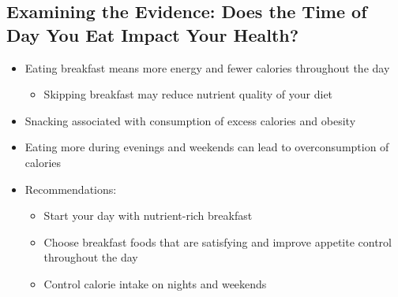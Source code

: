 \documentclass[12pt]{article}
\begin{document}
        \subsection{Examining the Evidence: Does the Time of Day You Eat Impact Your Health?}
            \begin{itemize}
                \item Eating breakfast means more energy and fewer calories throughout the day
                    \begin{itemize}
                        \item Skipping breakfast may reduce nutrient quality of your diet
                    \end{itemize}
                \item Snacking associated with consumption of excess calories and obesity
                \item Eating more during evenings and weekends can lead to overconsumption of calories
                \item Recommendations:
                    \begin{itemize}
                        \item Start your day with nutrient-rich breakfast
                        \item Choose breakfast foods that are satisfying and improve appetite control throughout the day
                        \item Control calorie intake on nights and weekends
                    \end{itemize}
            \end{itemize}
            
\end{document}
